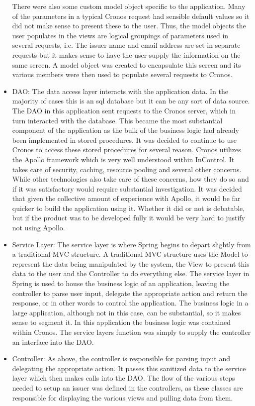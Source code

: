 \documentclass[a4paper, 11pt, titlepage]{article}
\begin{document}
\begin{itemize}
There were also some custom model object specific to the application. Many of the parameters in a typical Cronos request had sensible default values so it did not make sense to present these to the user. Thus, the model objects the user populates in the views are logical groupings of parameters used in several requests, i.e. The issuer name and email address are set in separate requests but it makes sense to have the user supply the information on the same screen. A model object was created to encapsulate this screen and its various members were then used to populate several requests to Cronos. 
\item DAO: The data access layer interacts with the application data. In the majority of cases this is an sql database but it can be any sort of data source. The DAO in this application sent requests to the Cronos server, which in turn interacted with the database. This became the most substantial component of the application as the bulk of the business logic had already been implemented in stored procedures. It was decided to continue to use Cronos to access these stored procedures for several reason. Cronos utilizes the Apollo framework which is very well understood within InControl. It takes care of security, caching, resource pooling and several other concerns. While other technologies also take care of these concerns, how they do so and if it was satisfactory would require substantial investigation. It was decided that given the collective amount of experience with Apollo, it would be far quicker to build the application using it. Whether it did or not is debatable, but if the product was to be developed fully it would be very hard to justify not using Apollo. 
\item Service Layer: The service layer is where Spring begins to depart slightly from a traditional MVC structure. A traditional MVC structure uses the Model to represent the data being manipulated by the system, the View to present this data to the user and the Controller to do everything else. The service layer in Spring is used to house the business logic of an application, leaving the controller to parse user input, delegate the appropriate action and return the response, or in other words to control the application. The business logic in a large application, although not in this case, can be substantial, so it makes sense to segment it. In this application the business logic was contained within Cronos. The service layers function was simply to supply the controller an interface into the DAO. 
\item Controller: As above, the controller is responsible for parsing input and delegating the appropriate action. It passes this sanitized data to the service layer which then makes calls into the DAO. The flow of the various steps needed to setup an issuer was defined in the controllers, as these classes are responsible for displaying the various views and pulling data from them. 

\end{itemize}
\end{document}
